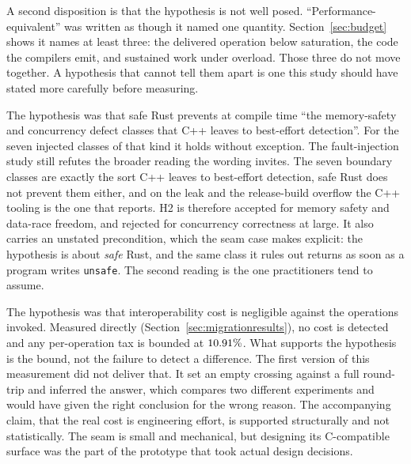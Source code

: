 \documentclass[english,oneside,a4paper,censored,csm,software-track-2020]{HYthesisML}
\begin{document}
\begin{description}
        A second disposition is that the hypothesis is not well posed.
        ``Performance-equivalent'' was written as though it named one quantity.
        Section~\ref{sec:budget} shows it names at least three: the delivered operation below
        saturation, the code the compilers emit, and sustained work under overload. Those three
        do not move together. A hypothesis that cannot tell them apart is one this study
        should have stated more carefully before measuring.
  \item[H2: supported in its precise form, refuted in its loose one.] The hypothesis was
        that safe Rust prevents at compile time ``the memory-safety and concurrency defect
        classes that C++ leaves to best-effort detection''. For the seven injected classes of
        that kind it holds without exception. The fault-injection study still refutes
        the broader reading the wording invites. The seven boundary classes are exactly the sort
        C++ leaves to best-effort detection, safe Rust does not prevent them either, and on the
        leak and the release-build overflow the C++ tooling is the one that reports. H2 is
        therefore accepted for memory safety and
        data-race freedom, and rejected for concurrency correctness at large. It also carries an
        unstated precondition, which the seam case makes explicit: the hypothesis is about
        \emph{safe} Rust, and the same class it rules out returns as soon as a program writes
        \texttt{unsafe}. The second reading
        is the one practitioners tend to assume.
  \item[H3: supported, and tested the right way on the second attempt.] The hypothesis was
        that interoperability cost is negligible against the operations invoked. Measured
        directly (Section~\ref{sec:migrationresults}), no cost is detected and any per-operation
        tax is bounded at $10.91\%$. What supports the hypothesis is the bound, not the
        failure to detect a difference. The first version of this measurement did
        not deliver that. It set an empty crossing against a full round-trip and inferred the
        answer, which compares two different experiments and would have given
        the right conclusion for the wrong reason. The accompanying claim, that the real cost
        is engineering effort, is supported structurally and not statistically. The seam is
        small and mechanical, but designing its C-compatible surface was the part of the
        prototype that took actual design decisions.
\end{description}
\end{document}

